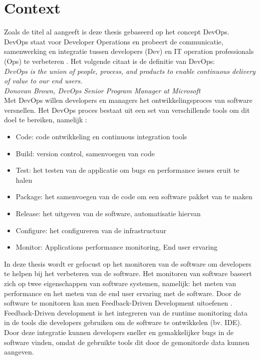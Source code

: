 \chapter{Context}
Zoals de titel al aangeeft is deze thesis gebaseerd op het concept DevOps. DevOps staat voor Developer Operations en probeert de communicatie, samenwerking en integratie tussen developers (Dev) en IT operation professionals (Ops) te verbeteren \cite{waller2015including}. Het volgende citaat is de definitie van DevOps: \\

\textit{DevOps is the union of people, process, and products to enable continuous delivery of value to our end users.\\
Donovan Brown, DevOps Senior Program Manager at Microsoft} \cite{de2016devops}\\

Met DevOps willen developers en managers het ontwikkelingsproces van software versnellen. Het DevOps proces bestaat uit een set van verschillende tools om dit doel te bereiken, namelijk \cite{DevOpsWiki}:
\begin{itemize}
\item Code: code ontwikkeling en continuous integration tools
\item Build: version control, samenvoegen van code
\item Test: het testen van de applicatie om bugs en performance issues eruit te halen
\item Package: het samenvoegen van de code om een software pakket van te maken
\item Release: het uitgeven van de software, automatisatie hiervan
\item Configure: het configureren van de infrastructuur
\item Monitor: Applications performance monitoring, End user ervaring
\end{itemize}

In deze thesis wordt er gefocust op het monitoren van de software om developers te helpen bij het verbeteren van de software. Het monitoren van software baseert zich op twee eigenschappen van software systemen, namelijk: het meten van performance en het meten van de end user ervaring met de software. Door de software te monitoren kan men Feedback-Driven Development uitoefenen \cite{cito2015runtime}. Feedback-Driven development is het integreren van de runtime monitoring data in de tools die developers gebruiken om de software te ontwikkelen (bv. IDE). Door deze integratie kunnen developers sneller en gemakkelijker bugs in de software vinden, omdat de gebruikte tools dit door de gemonitorde data kunnen aangeven.\\

